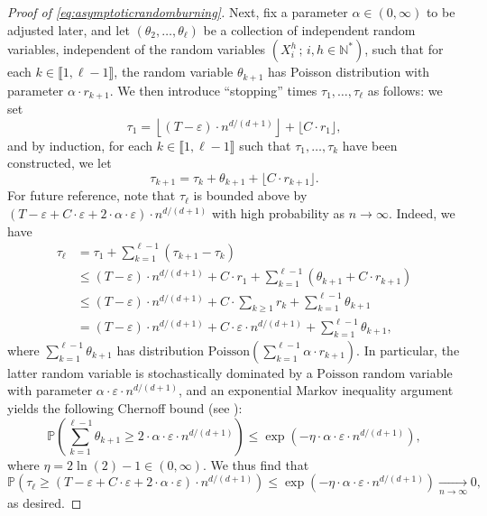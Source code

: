 \documentclass[a4paper,11pt]{article}
\begin{document}
\begin{proof}[Proof of \eqref{eq:asymptoticrandomburning}]
Next, fix a parameter $\alpha\in(0,\infty)$ to be adjusted later, and let $(\theta_2,\ldots,\theta_\ell)$ be a collection of independent random variables, independent of the random variables $\left(X_i^h\,;\,i,h\in\mathbb{N}^*\right)$, such that for each $k\in\llbracket1,\ell-1\rrbracket$, the random variable $\theta_{k+1}$ has Poisson distribution with parameter $\alpha\cdot r_{k+1}$.
We then introduce ``stopping'' times $\tau_1,\ldots,\tau_\ell$ as follows: we set
\[\tau_1=\left\lfloor(T-\varepsilon)\cdot n^{d/(d+1)}\right\rfloor+\lfloor C\cdot r_1\rfloor,\]
and by induction, for each $k\in\llbracket1,\ell-1\rrbracket$ such that $\tau_1,\ldots,\tau_k$ have been constructed, we let
\[\tau_{k+1}=\tau_k+\theta_{k+1}+\lfloor C\cdot r_{k+1}\rfloor.\]
For future reference, note that $\tau_\ell$ is bounded above by $(T-\varepsilon+C\cdot\varepsilon+2\cdot\alpha\cdot\varepsilon)\cdot n^{d/(d+1)}$ with high probability as $n\to\infty$.
Indeed, we have
\[\begin{split}
\tau_\ell&=\tau_1+\sum_{k=1}^{\ell-1}(\tau_{k+1}-\tau_k)\\
&\leq(T-\varepsilon)\cdot n^{d/(d+1)}+C\cdot r_1+\sum_{k=1}^{\ell-1}(\theta_{k+1}+C\cdot r_{k+1})\\
&\leq(T-\varepsilon)\cdot n^{d/(d+1)}+C\cdot\sum_{k\geq1}r_k+\sum_{k=1}^{\ell-1}\theta_{k+1}\\
&=(T-\varepsilon)\cdot n^{d/(d+1)}+C\cdot\varepsilon\cdot n^{d/(d+1)}+\sum_{k=1}^{\ell-1}\theta_{k+1},
\end{split}\]
where $\sum_{k=1}^{\ell-1}\theta_{k+1}$ has distribution $\mathrm{Poisson}\left(\sum_{k=1}^{\ell-1}\alpha\cdot r_{k+1}\right)$.
In particular, the latter random variable is stochastically dominated by a $\mathrm{Poisson}$ random variable with parameter $\alpha\cdot\varepsilon\cdot n^{d/(d+1)}$, and an exponential Markov inequality argument yields the following Chernoff bound (see \cite[Section 2.2]{concentration}):
\[\mathbb{P}\left(\sum_{k=1}^{\ell-1}\theta_{k+1}\geq2\cdot\alpha\cdot\varepsilon\cdot n^{d/(d+1)}\right)\leq\exp\left(-\eta\cdot\alpha\cdot\varepsilon\cdot n^{d/(d+1)}\right),\]
where $\eta=2\ln(2)-1\in(0,\infty)$.
We thus find that
\begin{equation}\label{eq:asymptotictaul}
\mathbb{P}\left(\tau_\ell\geq(T-\varepsilon+C\cdot\varepsilon+2\cdot\alpha\cdot\varepsilon)\cdot n^{d/(d+1)}\right)\leq\exp\left(-\eta\cdot\alpha\cdot\varepsilon\cdot n^{d/(d+1)}\right)\underset{n\to\infty}{\longrightarrow}0,
\end{equation}
as desired.


\end{proof}
\end{document}
